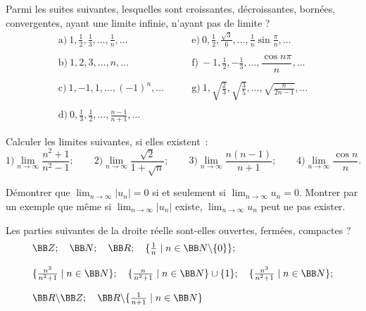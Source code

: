 \documentclass[12pt,french,oneside,a4paper]{memoir} %
\begin{document}
\begin{exo}
Parmi les suites suivantes, lesquelles sont croissantes, décroissantes, 
bornées, convergentes, ayant une limite infinie, n'ayant pas de limite ?
\begin{equation*}
\begin{array}{ll}
\mbox{a)}~1, \frac{1}{2}, \frac{1}{3}, \ldots, \frac{1}{n}, \ldots
&\mbox{e)}~0, \frac{1}{2}, \frac{\sqrt{3}}{6}, \ldots, \frac{1}{n} \sin \frac{\pi}{n}, \ldots \\
& \\
\mbox{b)}~1,2,3, \ldots,n,\ldots &
\mbox{f)}~-1, \frac{1}{2}, -\frac{1}{3}, \ldots, \dfrac{\cos n \pi}{n}, \ldots \\
& \\
\mbox{c)}~1,-1,1,\ldots,(-1)^n, \ldots\qquad &
\mbox{g)}~1, \sqrt{\frac{2}{3}}, \sqrt{\frac{3}{5}}, \ldots, \sqrt{\frac{n}{2n-1}}, \ldots \\
& \\
\mbox{d)}~0, \frac{1}{3}, \frac{1}{2}, \ldots, \frac{n-1}{n+1}, \ldots & 
\end{array}
\end{equation*}
\end{exo}
\begin{exo}
Calculer les limites suivantes, si elles existent~:
\begin{equation*}
\mbox{1)} \lim_{n \rightarrow \infty} \frac{n^2+1}{n^2-1}; \qquad
\mbox{2)} \lim_{n \rightarrow \infty} \frac{\sqrt{2}}{1+\sqrt{n}}; \qquad 
\mbox{3)} \lim_{n \rightarrow \infty} \frac{n(n-1)}{n+1}; \qquad 
\mbox{4)} \lim_{n \rightarrow \infty} \frac{\cos n}{n}.
\end{equation*}
\end{exo}
\begin{exo}
Démontrer que $\lim_{n \rightarrow \infty} \vert u_n \vert=0$ 
si et seulement si $\lim_{n \rightarrow \infty} u_n=0$. 
Montrer par un exemple que même si $\lim_{n \rightarrow \infty} \vert u_n \vert$ 
existe, $\lim_{n \rightarrow \infty} u_n$ peut ne pas exister.
\end{exo}
\begin{exo}
Les parties suivantes de la droite réelle sont-elles ouvertes, fermées, 
compactes ?
\begin{equation*}
\begin{array}{l}
{\BB Z}; \quad {\BB N}; \quad {\BB R}; \quad \{ \frac{1}{n} \mid n \in {\BB N} \backslash 
\{0\}\}; \\
\\
\{ \frac{n^2}{n^2+1} \mid n \in {\BB N} \}; \quad \{ \frac{n}{n^2+1} \mid n \in {\BB N} \} 
\cup \{1\}; \quad \{ \frac{n^3}{n^2+1} \mid n \in {\BB N} \}; \\
\\
{\BB R} \backslash {\BB Z}; \quad {\BB R} \backslash \{ \frac{1}{n+1} \mid n \in {\BB N} \} 
\end{array}
\end{equation*}
\end{exo}
\end{document}
